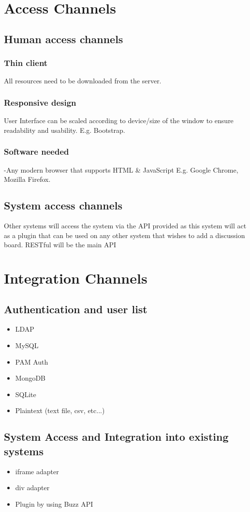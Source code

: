 
\section{Access Channels}
\subsection{Human access channels }
	\subsubsection{Thin client}
	All resources need to be downloaded from the server.
	\subsubsection{Responsive design}
	User Interface can be scaled according to device/size of the window to ensure readability and usability. E.g. Bootstrap.

	\subsubsection{Software needed}
-Any modern browser that supports HTML \& JavaScript E.g. Google Chrome, Mozilla Firefox.


\subsection{System access channels }
Other systems will access the system via the API provided as this system will act as a plugin that can be used on any other system that wishes to add a discussion board.
RESTful will be the main API

\section{Integration Channels}
	\subsection{Authentication and user list}
	\begin{itemize}
		\item LDAP
		\item MySQL
		\item PAM Auth
		\item MongoDB
		\item SQLite
		\item Plaintext (text file, csv, etc...)
	\end{itemize}
	\subsection{System Access and Integration into existing systems}
	\begin{itemize}
		\item iframe adapter
		\item div adapter
		\item Plugin by using Buzz API
	\end{itemize}
